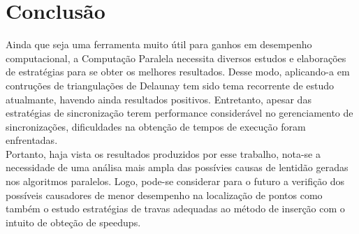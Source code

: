 \documentclass[a4paper, 12pt]{article}
\begin{document}
\section*{Conclusão}
Ainda que seja uma ferramenta muito útil para ganhos em desempenho computacional, a Computação Paralela necessita diversos estudos 
e elaborações de estratégias para se obter os melhores resultados. Desse modo, aplicando-a em contruções de triangulações de Delaunay
tem sido tema recorrente de estudo atualmante, havendo ainda resultados positivos. Entretanto, apesar das estratégias de sincronização
terem performance considerável no gerenciamento de sincronizações, dificuldades na obtenção de tempos de execução foram enfrentadas. \\

Portanto, haja vista os resultados produzidos por esse trabalho, nota-se a necessidade de uma análisa mais ampla das possívies causas
de lentidão geradas nos algoritmos paralelos. Logo, pode-se considerar para o futuro a verifição dos possíveis causadores de menor 
desempenho na localização de pontos como também o estudo estratégias de travas adequadas ao método de inserção com o intuito de obteção 
de speedups. \\




\end{document}
